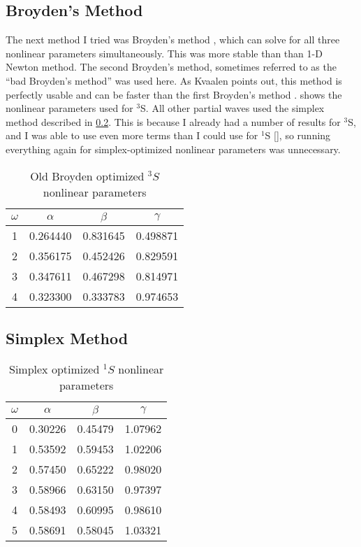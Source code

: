 \documentclass[Dissertation.tex]{subfiles}
\begin{document}
\subsection{Broyden's Method}
\label{sec:Broyden}
The next method I tried was Broyden's method \cite{Sauer2006}, which can solve for all three nonlinear parameters simultaneously. This was more stable than than 1-D Newton method. The second Broyden's method, sometimes referred to as the ``bad Broyden's method'' was used here. As Kvaalen points out, this method is perfectly usable and can be faster than the first Broyden's method \cite{Kvaalen1991}.  shows the nonlinear parameters used for $^3$S. All other partial waves used the simplex method described in \cref{sec:Simplex}. This is because I already had a number of results for $^3$S, and I was able to use even more terms than I could use for $^1$S \ref{}, so running everything again for simplex-optimized nonlinear parameters was unnecessary.

\setlength{\abovecaptionskip}{6pt}   %
\setlength{\belowcaptionskip}{6pt}   %
\begin{table}[H]
\centering
\begin{tabular}{c c c c}
\toprule
$\omega$ & $\alpha$ & $\beta$ & $\gamma$ \\ [0.5ex]
\midrule
1 & 0.264440 & 0.831645 & 0.498871 \\
2 & 0.356175 & 0.452426 & 0.829591 \\
3 & 0.347611 & 0.467298 & 0.814971 \\
4 & 0.323300 & 0.333783 & 0.974653 \\
\bottomrule
\end{tabular}
\caption{Old Broyden optimized $^3S$ nonlinear parameters}
\label{table:NonlinearOptimized3SBroyden}
\end{table}


\subsection{Simplex Method}
\label{sec:Simplex}

\begin{table}[H]
\centering
\begin{tabular}{c c c c}
\toprule
$\omega$ & $\alpha$ & $\beta$ & $\gamma$ \\ [0.5ex]
\midrule
0 & 0.30226 & 0.45479 & 1.07962 \\
1 & 0.53592 & 0.59453 & 1.02206 \\
2 & 0.57450 & 0.65222 & 0.98020 \\
3 & 0.58966 & 0.63150 & 0.97397 \\
4 & 0.58493 & 0.60995 & 0.98610 \\
5 & 0.58691 & 0.58045 & 1.03321 \\
\bottomrule
\end{tabular}
\caption{Simplex optimized $^1S$ nonlinear parameters}
\label{tab:NonlinearOptimized1SSimplex}
\end{table}
\end{document}
